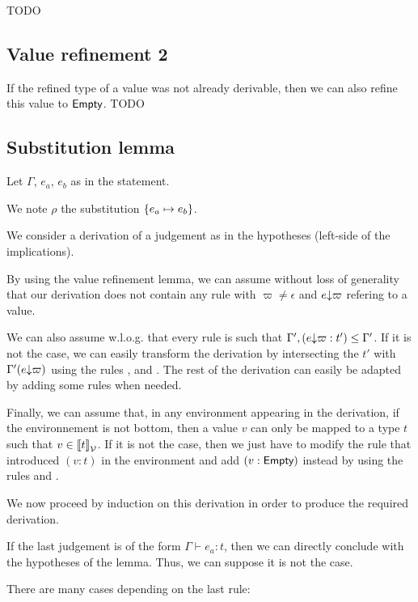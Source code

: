 \documentclass[a4paper]{article}
\theoremstyle{definition}
\begin{document}
        TODO

        \subsection{Value refinement 2}

        If the refined type of a value was not already derivable, then we can also refine this value to $\textsf{Empty}$. TODO

        \subsection{Substitution lemma}

        Let $\Gamma$, $e_a$, $e_b$ as in the statement.

        We note $\rho$ the substitution $\{e_a \mapsto e_b\}$.

        We consider a derivation of a judgement as in the hypotheses (left-side of the implications).

        By using the value refinement lemma, we can assume without loss of generality that our derivation does not contain
        any rule  with $\varpi\neq\epsilon$ and $e{\downarrow}\varpi$ refering to a value.

        We can also assume w.l.o.g. that every  rule is such that $\Gamma',(e{\downarrow}\varpi:t') \leq \Gamma'$. If it is not the case,
        we can easily transform the derivation by intersecting the $t'$ with $\Gamma'(e{\downarrow}\varpi)$
        using the rules ,  and .
        The rest of the derivation can easily be adapted by adding some  rules when needed.

        Finally, we can assume that, in any environment appearing in the derivation, if the environnement is not bottom,
        then a value $v$ can only be mapped to a type $t$ such that $v\in{\llbracket t \rrbracket}_{\mathcal{V}}$. If it is not the case, then we just have to modify the
         rule that introduced $(v:t)$ in the environment and add $(v:\textsf{Empty})$ instead by using the rules  and .

        We now proceed by induction on this derivation in order to produce the required derivation.
        
        If the last judgement is of the form $\Gamma \vdash e_a: t$, then we can directly conclude with the hypotheses of the lemma.
        Thus, we can suppose it is not the case.

        There are many cases depending on the last rule:
\end{document}
